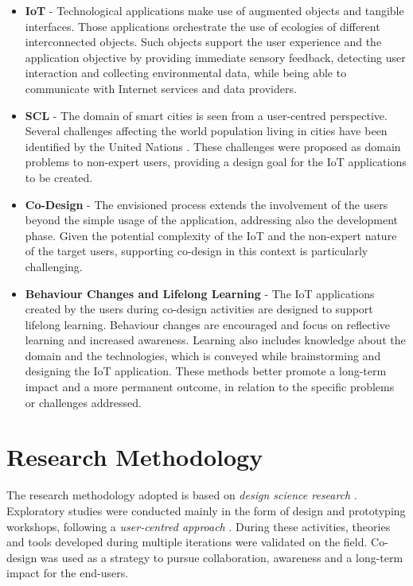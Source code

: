 \begin{itemize}
\item \textbf{IoT} - Technological applications make use of augmented objects and tangible interfaces. Those applications orchestrate the use of ecologies of different interconnected objects. Such objects support the user experience and the application objective by providing immediate sensory feedback, detecting user interaction and collecting environmental data, while being able to communicate with Internet services and data providers.

\item \textbf{SCL} - The domain of smart cities is seen from a user-centred perspective. Several challenges affecting the world population living in cities have been identified by the United Nations \autocite{un_smart_2015}. These challenges were proposed as domain problems to non-expert users, providing a design goal for the IoT applications to be created.

\item \textbf{Co-Design} - The envisioned process extends the involvement of the users beyond the simple usage of the application, addressing also the development phase. Given the potential complexity of the IoT and the non-expert nature of the target users, supporting co-design in this context is particularly challenging.

\item \textbf{Behaviour Changes and Lifelong Learning} -  The IoT applications created by the users during co-design activities are designed to support lifelong learning. Behaviour changes are encouraged and focus on reflective learning and increased awareness. Learning also includes knowledge about the domain and the technologies, which is conveyed while brainstorming and designing the IoT application. These methods better promote a long-term impact and a more permanent outcome, in relation to the specific problems or challenges addressed.
\end{itemize}


\section{Research Methodology}
\label{sec:research-methodology}

The research methodology adopted is based on \emph{design science research} \autocites{hevner_design_2010}{march_design_1995}. Exploratory studies were conducted mainly in the form of design and prototyping workshops, following a \emph{user-centred approach} \autocites{maguire_methods_2001}{gulliksen_key_2003}. During these activities, theories and tools developed during multiple iterations were validated on the field. Co-design was used as a strategy to pursue collaboration, awareness and a long-term impact for the end-users.

